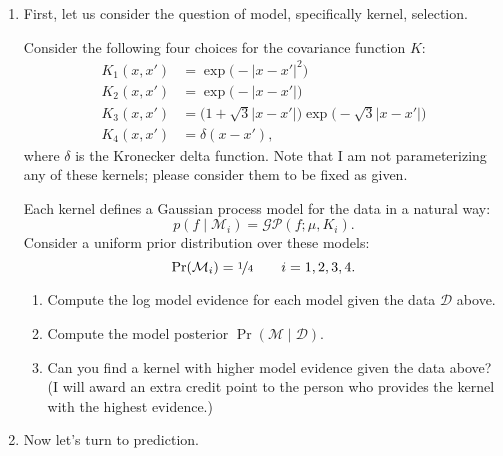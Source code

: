 \documentclass{article}
\newcommand{\given}{\mid}
\newcommand{\mc}[1]{\mathcal{#1}}
\newcommand{\data}{\mc{D}}
\newcommand{\model}{\mc{M}}
\begin{document}
\begin{enumerate}
\item
  First, let us consider the question of model, specifically kernel,
  selection.

  Consider the following four choices for the covariance function $K$:
  \begin{align*}
    K_1(x, x') &= \exp\bigl(-\lvert x - x' \rvert^2\bigr) \\
    K_2(x, x') &= \exp\bigl(-\lvert x - x' \rvert\bigr) \\
    K_3(x, x') &= \bigl(1 + \sqrt{3} \lvert x - x' \rvert\bigr)
                  \exp\bigl(-\sqrt{3} \lvert x - x' \rvert\bigr) \\
    K_4(x, x') &= \delta(x - x'),
  \end{align*}
  where $\delta$ is the Kronecker delta function. Note that I am not
  parameterizing any of these kernels; please consider them to be fixed
  as given.

  Each kernel defines a Gaussian process model for the data in a natural way:
  \[p(f \given \model_i) = \mc{GP}(f; \mu, K_i).\]
  Consider a uniform prior distribution over these models:
  \[\Pr(\model_i) = \nicefrac{1}{4} \qquad i = 1, 2, 3, 4.\]

  \begin{enumerate}
  \item
    Compute the log model evidence for each model given the data
    $\data$ above.
  \item
    Compute the model posterior $\Pr(\model \given \data)$.
  \item
    Can you find a kernel with higher model evidence given the data
    above?  (I will award an extra credit point to the person who
    provides the kernel with the highest evidence.)
  \end{enumerate}

\item

  Now let's turn to prediction.


\end{enumerate}
\end{document}
